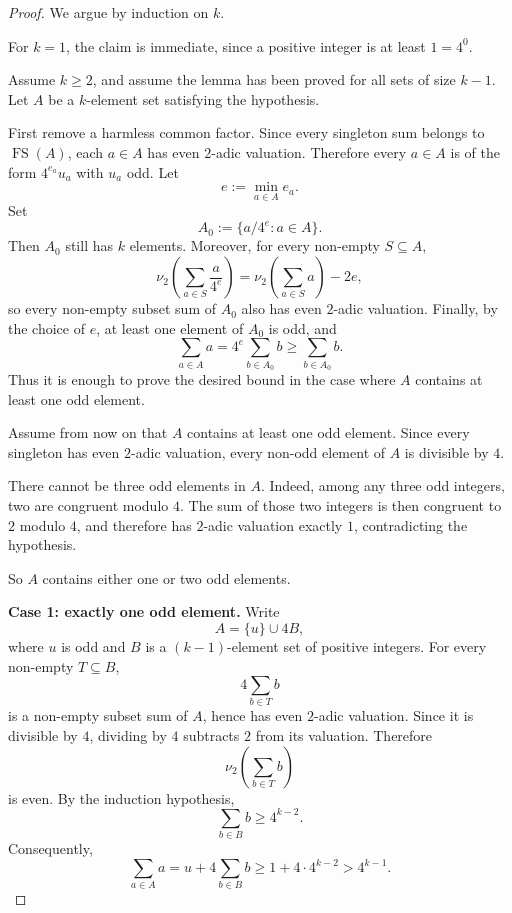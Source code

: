 \documentclass[11pt]{article}
\newcommand{\FS}{\operatorname{FS}}
\begin{document}
\begin{proof}
We argue by induction on $k$.

For $k=1$, the claim is immediate, since a positive integer is at least $1=4^0$.

Assume $k\geq 2$, and assume the lemma has been proved for all sets of size $k-1$. Let $A$ be a $k$-element set satisfying the hypothesis.

First remove a harmless common factor. Since every singleton sum belongs to $\FS(A)$, each $a\in A$ has even $2$-adic valuation. Therefore every $a\in A$ is of the form $4^{e_a}u_a$ with $u_a$ odd. Let
\[
    e:=\min_{a\in A} e_a.
\]
Set
\[
    A_0:=\{a/4^e:a\in A\}.
\]
Then $A_0$ still has $k$ elements. Moreover, for every non-empty $S\subseteq A$,
\[
    \nu_2\left(\sum_{a\in S} \frac{a}{4^e}\right)
    =
    \nu_2\left(\sum_{a\in S}a\right)-2e,
\]
so every non-empty subset sum of $A_0$ also has even $2$-adic valuation. Finally, by the choice of $e$, at least one element of $A_0$ is odd, and
\[
    \sum_{a\in A}a=4^e\sum_{b\in A_0}b\geq \sum_{b\in A_0}b.
\]
Thus it is enough to prove the desired bound in the case where $A$ contains at least one odd element.

Assume from now on that $A$ contains at least one odd element. Since every singleton has even $2$-adic valuation, every non-odd element of $A$ is divisible by $4$.

There cannot be three odd elements in $A$. Indeed, among any three odd integers, two are congruent modulo $4$. The sum of those two integers is then congruent to $2$ modulo $4$, and therefore has $2$-adic valuation exactly $1$, contradicting the hypothesis.

So $A$ contains either one or two odd elements.

\medskip
\noindent\textbf{Case 1: exactly one odd element.}
Write
\[
    A=\{u\}\cup 4B,
\]
where $u$ is odd and $B$ is a $(k-1)$-element set of positive integers. For every non-empty $T\subseteq B$,
\[
    4\sum_{b\in T}b
\]
is a non-empty subset sum of $A$, hence has even $2$-adic valuation. Since it is divisible by $4$, dividing by $4$ subtracts $2$ from its valuation. Therefore
\[
    \nu_2\left(\sum_{b\in T}b\right)
\]
is even. By the induction hypothesis,
\[
    \sum_{b\in B}b\geq 4^{k-2}.
\]
Consequently,
\[
    \sum_{a\in A}a
    =u+4\sum_{b\in B}b
    \geq 1+4\cdot 4^{k-2}
    >4^{k-1}.
\]


\end{proof}
\end{document}
